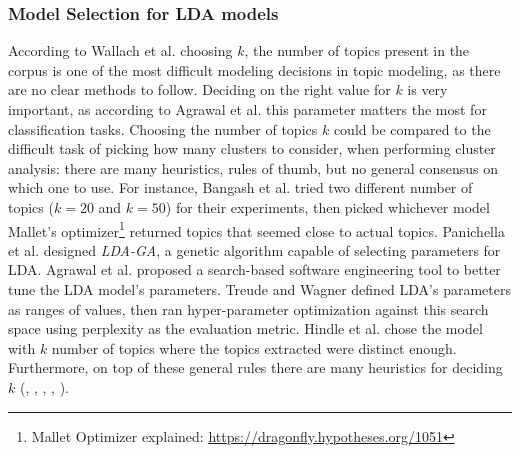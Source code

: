         \subsubsection{Model Selection for LDA models}
        
            According to Wallach et al. \cite{wallach2009rethinking} choosing $k$, the number of topics present in the corpus is one of the most difficult modeling decisions in topic modeling, as there are no clear methods to follow. Deciding on the right value for $k$ is very important, as according to Agrawal et al. \cite{agrawal2018wrong} this parameter matters the most for classification tasks. Choosing the number of topics $k$ could be compared to the difficult task of picking how many clusters to consider, when performing cluster analysis: there are many heuristics, rules of thumb, but no general consensus on which one to use. For instance, Bangash et al. \cite{bangash2019developers} tried two different number of topics ($k=20$ and $k=50$) for their experiments, then picked whichever model Mallet's optimizer\footnote{Mallet Optimizer explained: \url{https://dragonfly.hypotheses.org/1051}} returned topics that seemed close to actual topics. Panichella et al. \cite{panichella2013effectively} designed \textit{LDA-GA}, a genetic algorithm capable of selecting parameters for LDA. Agrawal et al. \cite{agrawal2018wrong} proposed a search-based software engineering tool to better tune the LDA model's parameters. Treude and Wagner \cite{treude2019predicting} defined LDA's parameters as ranges of values, then ran hyper-parameter optimization against this search space using perplexity as the evaluation metric. Hindle et al. \cite{hindle2012relating} chose the model with $k$ number of topics where the topics extracted were distinct enough. Furthermore, on top of these general rules there are many heuristics for deciding $k$ (\cite{arun2010finding}, \cite{cao2009density}, \cite{deveaud2014accurate}, \cite{griffiths2004finding}, \cite{zhao2015heuristic}).
            
